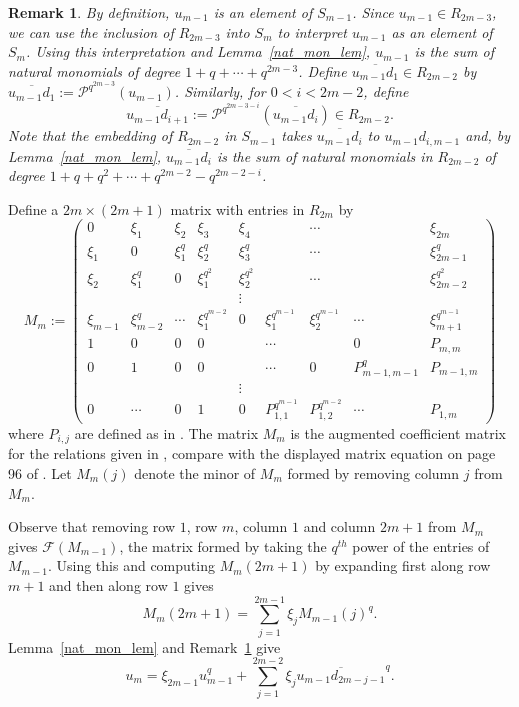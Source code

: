 \documentclass{amsart}
\newtheorem{remark}[subsection]{Remark}
\newcommand{\PP}{\mathcal{P}}
\newcommand{\frob}{\mathcal{F}}
\begin{document}
\begin{remark} \label{rem_u_m-1} By definition, $u_{m-1}$ is an element of $S_{m-1}$. Since $u_{m-1}\in R_{2m-3}$, we can use the inclusion of $R_{2m-3}$ into $S_m$ to interpret 
$u_{m-1}$ as an element of $S_m$. Using this interpretation and Lemma~\ref{nat_mon_lem}, $u_{m-1}$ is the sum of natural monomials of degree $1+q+\cdots +q^{2m-3}$.
Define $\overline{u_{m-1}d_1}\in R_{2m-2}$ by $\overline{u_{m-1}d_1}:=\PP^{q^{2m-3}}(u_{m-1})$.
Similarly, for $0<i<2m-2$, define  $$\overline{u_{m-1}d_{i+1}}:=\PP^{q^{2m-3-i}}(\overline{u_{m-1}d_i})\in R_{2m-2}.$$
Note that the embedding of $R_{2m-2}$ in $S_{m-1}$ takes  $\overline{u_{m-1}d_i}$ to $u_{m-1}d_{i,m-1}$
and, by Lemma~\ref{nat_mon_lem},  $\overline{u_{m-1}d_i}$ is the sum of  natural monomials in $R_{2m-2}$ of degree $1+q+q^2+\cdots +q^{2m-2}-q^{2m-2-i}$.
\end{remark}

Define a $2m\times (2m+1)$ matrix with entries in $R_{2m}$ by
$$M_m:=\begin{pmatrix}
      0& \xi_{1}& \xi_{2}      &\xi_3   &\xi_4&& \cdots && \xi_{2m}\\
\xi_1& 0         & \xi_{1}^q  & \xi_{2}^q   &  \xi_3^q&& \cdots && \xi_{2m-1}^q\\
\xi_2& \xi_1^q& 0            &\xi_1^{q^2} &\xi_2^{q^2} && \cdots && \xi_{2m-2}^{q^2}\\
&&&&\vdots&&&& \\
\xi_{m-1}&\xi_{m-2}^q&\cdots &\xi_1^{q^{m-2}}&0&\xi_1^{q^{m-1}}&\xi_2^{q^{m-1}}&\cdots &\xi_{m+1}^{q^{m-1}}\\
1&0&0&0&& \cdots &&0& P_{m,m}\\
0&1&0&0&&\cdots &0& P_{m-1,m-1}^q&P_{m-1,m}\\
&&&&\vdots&&&& \\
0&\cdots&0&1&0&P_{1,1}^{q^{m-1}}& P_{1,2}^{q^{m-2}}&\cdots&P_{1,m}
\end{pmatrix}
$$ 
where $P_{i,j}$ are defined as in \cite[Prop. 8.3.7]{benson-polyinvafinigrou:93}.
The matrix $M_m$ is the augmented coefficient matrix for the relations given in \cite[Theorem 8.3.11]{benson-polyinvafinigrou:93},
compare with the displayed matrix equation on page 96 of \cite{benson-polyinvafinigrou:93}. 
Let $M_m(j)$ denote the minor of $M_m$ formed by removing column $j$ from $M_m$.

Observe that removing row $1$, row $m$, column $1$ and column $2m+1$ from $M_m$ gives $\frob(M_{m-1})$, 
the matrix formed by taking the $q^{th}$ power of the entries of  $M_{m-1}$. 
Using this and computing $M_m(2m+1)$ by expanding first along row $m+1$ and then along row $1$ gives
\begin{equation}\label{expansion} M_m(2m+1)=\sum_{j=1}^{2m-1} \xi_j M_{m-1}(j)^q.\end{equation}
Lemma~\ref{nat_mon_lem} and Remark~\ref{rem_u_m-1} give
\begin{equation} \label{um-expr} u_m=\xi_{2m-1}u_{m-1}^q+\sum_{j=1}^{2m-2}\xi_j\overline{u_{m-1}d_{2m-j-1}}^q.
\end{equation}
\end{document}
